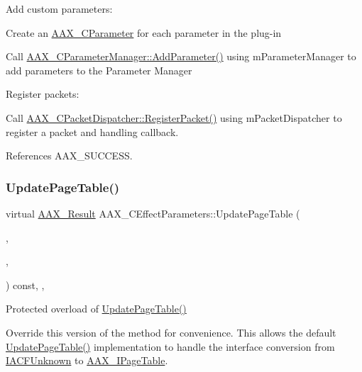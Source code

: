 Add custom parameters\+: \begin{DoxyItemize}
\item Create an \mbox{\hyperlink{a01537}{A\+A\+X\+\_\+\+C\+Parameter}} for each parameter in the plug-\/in \item Call \mbox{\hyperlink{a01545_ae2f9631b33c012f7a8c042df9655b28c}{A\+A\+X\+\_\+\+C\+Parameter\+Manager\+::\+Add\+Parameter()}} using m\+Parameter\+Manager to add parameters to the Parameter Manager\end{DoxyItemize}
Register packets\+: \begin{DoxyItemize}
\item Call \mbox{\hyperlink{a01529_a1848f0bfa473b54e9ee8e32872c89cb1}{A\+A\+X\+\_\+\+C\+Packet\+Dispatcher\+::\+Register\+Packet()}} using m\+Packet\+Dispatcher to register a packet and handling callback. \end{DoxyItemize}


References A\+A\+X\+\_\+\+S\+U\+C\+C\+E\+SS.

\mbox{\label{a01481_a79c283d2698c39e664e590f256c51d02}} 
\subsubsection{\texorpdfstring{UpdatePageTable()}{UpdatePageTable()}\hspace{0.1cm}{\footnotesize\ttfamily [2/2]}}
{\footnotesize\ttfamily virtual \mbox{\hyperlink{a00392_a4d8f69a697df7f70c3a8e9b8ee130d2f}{A\+A\+X\+\_\+\+Result}} A\+A\+X\+\_\+\+C\+Effect\+Parameters\+::\+Update\+Page\+Table (\begin{DoxyParamCaption}\item[{uint32\+\_\+t}]{,  }\item[{int32\+\_\+t}]{,  }\item[{\mbox{\hyperlink{a01849}{A\+A\+X\+\_\+\+I\+Page\+Table}} \&}]{ }\end{DoxyParamCaption}) const\hspace{0.3cm}{\ttfamily [inline]}, {\ttfamily [protected]}, {\ttfamily [virtual]}}

Protected overload of \mbox{\hyperlink{a01481_a6a2a5cfe04b343f6ac47becb0e77ba84}{Update\+Page\+Table()}}

Override this version of the method for convenience. This allows the default \mbox{\hyperlink{a01481_a6a2a5cfe04b343f6ac47becb0e77ba84}{Update\+Page\+Table()}} implementation to handle the interface conversion from \mbox{\hyperlink{a01409}{I\+A\+C\+F\+Unknown}} to \mbox{\hyperlink{a01849}{A\+A\+X\+\_\+\+I\+Page\+Table}}.

